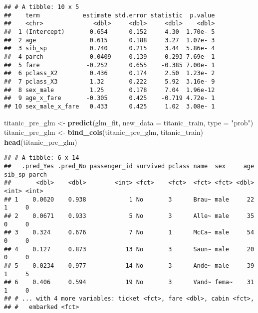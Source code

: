 \documentclass[]{article}
\newenvironment{Shaded}{\begin{snugshade}}{\end{snugshade}}
\newcommand{\DataTypeTok}[1]{\textcolor[rgb]{0.13,0.29,0.53}{#1}}
\newcommand{\KeywordTok}[1]{\textcolor[rgb]{0.13,0.29,0.53}{\textbf{#1}}}
\newcommand{\NormalTok}[1]{#1}
\newcommand{\OperatorTok}[1]{\textcolor[rgb]{0.81,0.36,0.00}{\textbf{#1}}}
\newcommand{\StringTok}[1]{\textcolor[rgb]{0.31,0.60,0.02}{#1}}
\begin{document}
\begin{verbatim}
## # A tibble: 10 x 5
##    term            estimate std.error statistic  p.value
##    <chr>              <dbl>     <dbl>     <dbl>    <dbl>
##  1 (Intercept)       0.654      0.152     4.30  1.70e- 5
##  2 age               0.615      0.188     3.27  1.07e- 3
##  3 sib_sp            0.740      0.215     3.44  5.86e- 4
##  4 parch             0.0409     0.139     0.293 7.69e- 1
##  5 fare             -0.252      0.655    -0.385 7.00e- 1
##  6 pclass_X2         0.436      0.174     2.50  1.23e- 2
##  7 pclass_X3         1.32       0.222     5.92  3.16e- 9
##  8 sex_male          1.25       0.178     7.04  1.96e-12
##  9 age_x_fare       -0.305      0.425    -0.719 4.72e- 1
## 10 sex_male_x_fare   0.433      0.425     1.02  3.08e- 1
\end{verbatim}

\begin{Shaded}
\begin{Highlighting}[]
\NormalTok{titanic_pre_glm <-}\StringTok{ }\KeywordTok{predict}\NormalTok{(glm_fit, }\DataTypeTok{new_data =}\NormalTok{ titanic_train, }\DataTypeTok{type =} \StringTok{"prob"}\NormalTok{)}
\NormalTok{titanic_pre_glm <-}\StringTok{ }\KeywordTok{bind_cols}\NormalTok{(titanic_pre_glm, titanic_train)}
\KeywordTok{head}\NormalTok{(titanic_pre_glm)}
\end{Highlighting}
\end{Shaded}

\begin{verbatim}
## # A tibble: 6 x 14
##   .pred_Yes .pred_No passenger_id survived pclass name  sex     age sib_sp parch
##       <dbl>    <dbl>        <int> <fct>    <fct>  <fct> <fct> <dbl>  <int> <int>
## 1    0.0620    0.938            1 No       3      Brau~ male     22      1     0
## 2    0.0671    0.933            5 No       3      Alle~ male     35      0     0
## 3    0.324     0.676            7 No       1      McCa~ male     54      0     0
## 4    0.127     0.873           13 No       3      Saun~ male     20      0     0
## 5    0.0234    0.977           14 No       3      Ande~ male     39      1     5
## 6    0.406     0.594           19 No       3      Vand~ fema~    31      1     0
## # ... with 4 more variables: ticket <fct>, fare <dbl>, cabin <fct>,
## #   embarked <fct>
\end{verbatim}

\begin{Shaded}
\end{Shaded}
\end{document}
